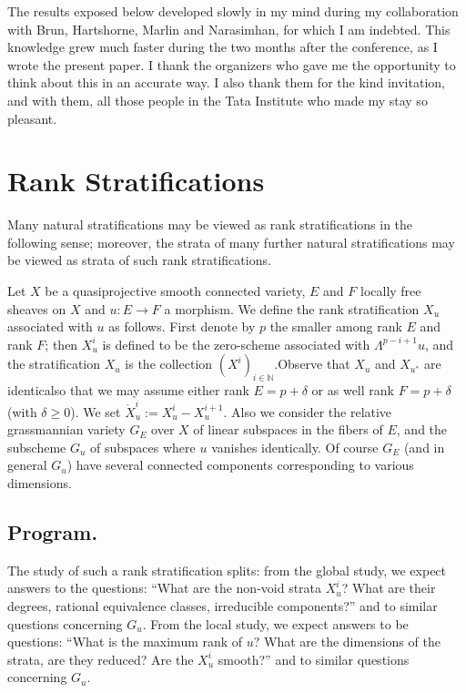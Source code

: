 The results exposed below developed slowly in my mind during my
collaboration with Brun, Hartshorne, Marlin and Narasimhan, for which
I am indebted. This knowledge grew much faster during the two months
after the conference, as I wrote the present paper. I thank the
organizers who gave me the opportunity to think about this in an
accurate way. I also thank them for the kind invitation, and with
them, all those people in the Tata Institute who made my stay so
pleasant.

\section{Rank Stratifications}\label{chap6-sec1}

Many natural stratifications may be viewed as rank stratifications in
the following sense; moreover, the strata of many further natural
stratifications may be viewed as strata of such rank stratifications.

\begin{definition}\label{chap6-defi1.1}
Let $X$ be a quasiprojective smooth connected variety, $E$ and $F$
locally free sheaves on $X$ and $u:E\to F$ a morphism. We define the
rank stratification $X_{u}$ associated with $u$ as follows. First
denote by $p$ the smaller among rank $E$ and rank $F$; then
$X^{i}_{u}$ is defined to be the zero-scheme associated with
$\Lambda^{p-i+1}u$, and the stratification $X_{u}$ is the collection
$(X^{i})_{i\in \mathbb{N}}$.Observe that $X_{u}$ and $X_{u^{*}}$ are
identical\pageoriginale so that we may assume either rank $E=p+\delta$
or as well rank $F=p+\delta$ (with $\delta\geq 0$). We set
$\ring{X}^{i}_{u}:=X^{i}_{u}-X^{i+1}_{u}$. Also we consider the
relative grassmannian variety $G_{E}$ over $X$ of linear subspaces in
the fibers of $E$, and the subscheme $G_{u}$ of subspaces where $u$
vanishes identically. Of course $G_{E}$ (and in general $G_{u}$) have
several connected components corresponding to various dimensions.
\end{definition}

\setcounter{subsection}{1}
\subsection{Program.}\label{chap6-sec1.2}

The study of such a rank stratification splits: from the global study,
we expect answers to the questions: ``What are the non-void strata
$X^{i}_{u}$? What are their degrees, rational equivalence classes,
irreducible components?'' and to similar questions concerning
$G_{u}$. From the local study, we expect answers to be questions:
``What is the maximum rank of $u$? What are the dimensions of the
strata, are they reduced? Are the $X^{i}_{u}$ smooth?'' and to similar
questions concerning $G_{u}$. 

